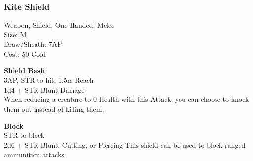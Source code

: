 \subsubsection{Kite Shield}\label{weapon:kiteShield}
Weapon, Shield, One-Handed, Melee\\
Size: M\\
Draw/Sheath: 7AP\\
Cost: 50 Gold

\textbf{Shield Bash}\\
3AP, STR to hit, 1.5m Reach\\
1d4 + \texttimes STR Blunt Damage\\
When reducing a creature to 0 Health with this Attack, you can choose to knock them out instead of killing them.

\textbf{Block}\\
STR to block\\
2d6 + \texttimes STR Blunt, Cutting, or Piercing
This shield can be used to block ranged ammunition attacks.\\